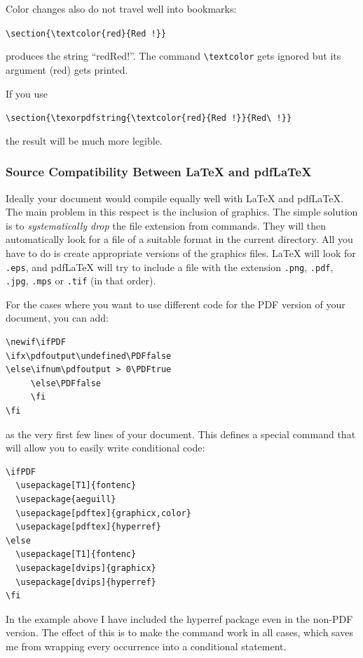 Color changes also do not travel well into bookmarks:
\begin{code}
\verb+\section{\textcolor{red}{Red !}}+
\end{code}
produces the string ``redRed!''. The command \verb+\textcolor+ gets ignored
but its argument (red) gets printed. 

If you use
\begin{code}
\verb+\section{\texorpdfstring{\textcolor{red}{Red !}}{Red\ !}}+
\end{code}
the result will be much more legible.


\subsubsection{Source Compatibility Between \LaTeX{} and pdf\LaTeX{}}
\label{sec:pdfcompat}


Ideally your document would compile equally well with \LaTeX{} and
pdf\LaTeX{}. The main problem in this respect is the inclusion of
graphics. The simple solution is to \emph{systematically drop} the
file extension from  commands. They will then
automatically look for a file of a suitable format in the current
directory. All you have to do is create appropriate versions of the
graphics files. \LaTeX{} will look for \texttt{.eps}, and pdf\LaTeX{}
will try to include a file with the extension
\texttt{.png}, \texttt{.pdf}, \texttt{.jpg}, \texttt{.mps} or \texttt{.tif}
(in that order).


For the cases where you want to use different code for the
PDF version of your document, you can add:
\begin{code}
\begin{verbatim}
\newif\ifPDF
\ifx\pdfoutput\undefined\PDFfalse
\else\ifnum\pdfoutput > 0\PDFtrue
     \else\PDFfalse
     \fi
\fi
\end{verbatim}
\end{code}
as the very first few lines of your document. This defines a special
command that will allow you to easily write conditional code:
\begin{code}
\begin{verbatim}
\ifPDF
  \usepackage[T1]{fontenc}
  \usepackage{aeguill}
  \usepackage[pdftex]{graphicx,color}
  \usepackage[pdftex]{hyperref}
\else    
  \usepackage[T1]{fontenc}
  \usepackage[dvips]{graphicx}
  \usepackage[dvips]{hyperref}
\fi
\end{verbatim}
\end{code}
In the example above I have included the hyperref package even in the
non-PDF version. The effect of this is to make the  command
work in all cases, which saves me from wrapping every occurrence into a
conditional statement.

